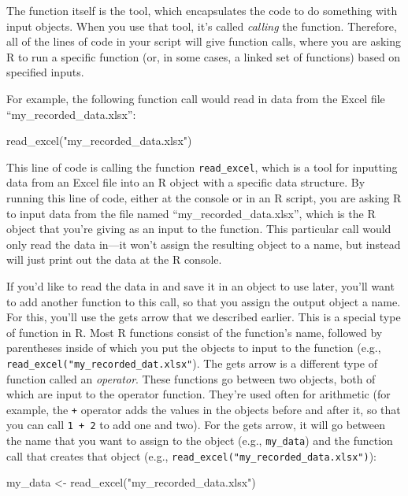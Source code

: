 \documentclass[]{tufte-book}
\newenvironment{Shaded}{}{}
\newcommand{\FunctionTok}[1]{\textcolor[rgb]{0.02,0.16,0.49}{#1}}
\newcommand{\NormalTok}[1]{#1}
\newcommand{\OtherTok}[1]{\textcolor[rgb]{0.00,0.44,0.13}{#1}}
\newcommand{\StringTok}[1]{\textcolor[rgb]{0.25,0.44,0.63}{#1}}
\begin{document}
The function itself is the tool, which encapsulates the code to do something with
input objects. When you use that tool, it's called \emph{calling} the function. Therefore,
all of the lines of code in your script will give function calls, where you are
asking R to run a specific function (or, in some cases, a linked set of functions)
based on specified inputs.

For example, the following function call would read in data from the Excel file
``my\_recorded\_data.xlsx'':

\begin{Shaded}
\begin{Highlighting}[]
\FunctionTok{read\_excel}\NormalTok{(}\StringTok{"my\_recorded\_data.xlsx"}\NormalTok{)}
\end{Highlighting}
\end{Shaded}

This line of code is calling the function \texttt{read\_excel}, which is a tool for inputting
data from an Excel file into an R object with a specific data structure. By running
this line of code, either at the console or in an R script, you are asking R to input
data from the file named ``my\_recorded\_data.xlsx'', which is the R object that you're
giving as an input to the function. This particular call would only read the data in---it
won't assign the resulting object to a name, but instead will just print out the data
at the R console.

If you'd like to read the data in and save it in an object to use later, you'll
want to add another function to this call, so that you assign the output object
a name. For this, you'll use the gets arrow that we described earlier. This is a
special type of function in R. Most R functions consist of the function's name,
followed by parentheses inside of which you put the objects to input to the
function (e.g., \texttt{read\_excel("my\_recorded\_dat.xlsx"}). The gets arrow is a
different type of function called an \emph{operator}. These functions go between two
objects, both of which are input to the operator function. They're used often
for arithmetic (for example, the \texttt{+} operator adds the values in the objects
before and after it, so that you can call \texttt{1\ +\ 2} to add one and two). For the
gets arrow, it will go between the name that you want to assign to the object
(e.g., \texttt{my\_data}) and the function call that creates that object (e.g.,
\texttt{read\_excel("my\_recorded\_data.xlsx")}):

\begin{Shaded}
\begin{Highlighting}[]
\NormalTok{my\_data }\OtherTok{\textless{}{-}} \FunctionTok{read\_excel}\NormalTok{(}\StringTok{"my\_recorded\_data.xlsx"}\NormalTok{)}
\end{Highlighting}
\end{Shaded}
\end{document}
